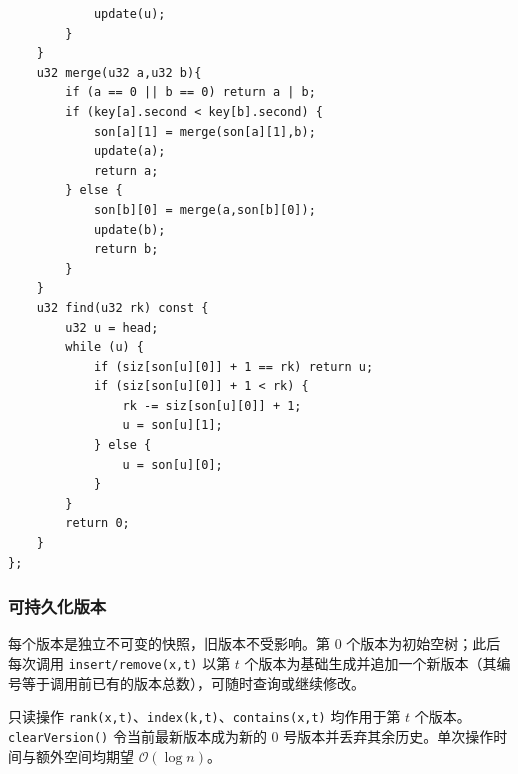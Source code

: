 \begin{lstlisting}
            update(u);
        }
    }
    u32 merge(u32 a,u32 b){
        if (a == 0 || b == 0) return a | b;
        if (key[a].second < key[b].second) {
            son[a][1] = merge(son[a][1],b);
            update(a);
            return a;
        } else {
            son[b][0] = merge(a,son[b][0]);
            update(b);
            return b;
        }
    }
    u32 find(u32 rk) const {
        u32 u = head;
        while (u) {
            if (siz[son[u][0]] + 1 == rk) return u;
            if (siz[son[u][0]] + 1 < rk) {
                rk -= siz[son[u][0]] + 1;
                u = son[u][1];
            } else {
                u = son[u][0];
            }
        }
        return 0;
    }
};
\end{lstlisting}

\subsubsection{可持久化版本}

每个版本是独立不可变的快照，旧版本不受影响。第 $0$ 个版本为初始空树；此后每次调用 \texttt{insert/remove(x,t)} 以第 $t$ 个版本为基础生成并追加一个新版本（其编号等于调用前已有的版本总数），可随时查询或继续修改。

只读操作 \texttt{rank(x,t)}、\texttt{index(k,t)}、\texttt{contains(x,t)} 均作用于第 $t$ 个版本。\texttt{clearVersion()} 令当前最新版本成为新的 0 号版本并丢弃其余历史。单次操作时间与额外空间均期望 $\mathcal{O}(\log n)$。

